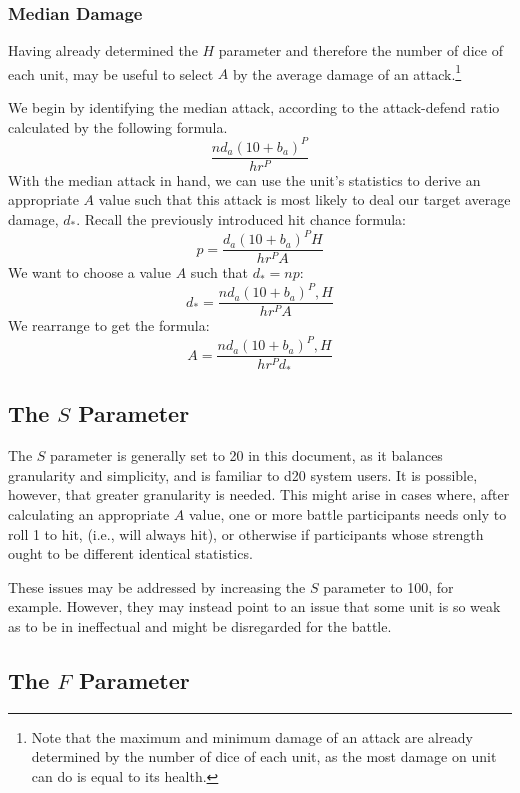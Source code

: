 \subsubsection{Median Damage}

Having already determined the $H$ parameter and
therefore the number of dice of each unit,
may be useful to select $A$ by the average damage of an attack.\footnote{
    Note that the maximum and minimum damage of an attack
    are already determined by the number of dice of each unit,
    as the most damage on unit can do is equal to its health.
}

We begin by identifying the median attack,
according to the attack-defend ratio calculated by the following formula.
\[
    \frac
        {n d_a (10 + b_a)^P}
        {h r^P}
\]
With the median attack in hand,
we can use the unit's statistics to derive an appropriate $A$ value
such that this attack is most likely to deal our target average damage, $d_*$.
Recall the previously introduced hit chance formula:
\[
    p = \frac
        {d_a (10 + b_a)^P H}
        {h r^P A}
\]
We want to choose a value $A$ such that $d_* = n p$:
\[
    d_* = \frac
        {n d_a (10 + b_a)^P, H}
        {h r^P A}
\]
We rearrange to get the formula:
\[
    A = \frac
        {n d_a (10 + b_a)^P, H}
        {h r^P d_*}
\]


\subsection{The $S$ Parameter}
The $S$ parameter is generally set to 20 in this document,
as it balances granularity and simplicity,
and is familiar to d20 system users.
It is possible, however, that greater granularity is needed.
This might arise in cases where,
after calculating an appropriate $A$ value,
one or more battle participants needs only to roll 1 to hit,
(i.e., will always hit),
or otherwise if participants whose strength ought to be different
identical statistics.

These issues may be addressed by increasing the $S$ parameter to 100,
for example.
However, they may instead point to an issue that some unit
is so weak as to be in ineffectual and might be disregarded for the battle.

\subsection{The $F$ Parameter}

